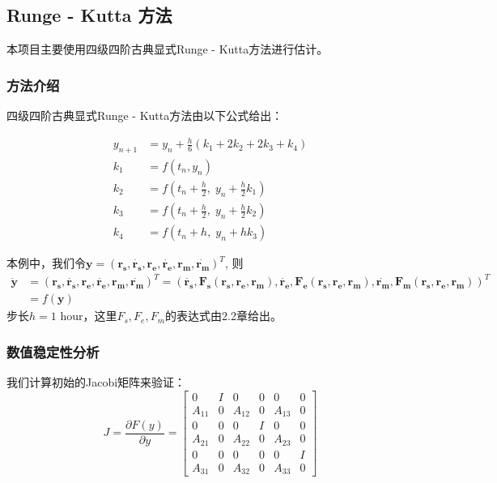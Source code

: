 \documentclass[hidelinks]{article}
\newcommand{\vt}[1]{\mathbf{#1}}
\begin{document}
\subsection{Runge - Kutta 方法}

本项目主要使用四级四阶古典显式Runge - Kutta方法进行估计。
\subsubsection{方法介绍}

四级四阶古典显式Runge - Kutta方法由以下公式给出：

\begin{align*}
y_{n+1} &= y_n + \frac{h}{6} \left(k_1 + 2k_2 + 2k_3 + k_4\right)\\
k_1 &= f(t_n, y_n) \\
k_2 &= f\left(t_n + \frac{h}{2},\; y_n + \frac{h}{2}k_1\right) \\
k_3 &= f\left(t_n + \frac{h}{2},\; y_n + \frac{h}{2}k_2\right) \\
k_4 &= f\left(t_n + h,\; y_n + h k_3\right)
\end{align*}

本例中，我们令$\vt{y} = (\vt{r_s}, \dot{\vt{r_s}}, \vt{r_e}, \dot{\vt{r_e}}, \vt{r_m}, \dot{\vt{r_m}})^T$, 则
\begin{align*}
\dot{\vt{y}} &= (\vt{r_s}, \dot{\vt{r_s}}, \vt{r_e}, \dot{\vt{r_e}}, \vt{r_m}, \dot{\vt{r_m}})^T = (\dot{\vt{r_s}}, \vt{F_s}(\vt{r_s}, \vt{r_e}, \vt{r_m}), \dot{\vt{r_e}}, \vt{F_e}(\vt{r_s}, \vt{r_e}, \vt{r_m}), \dot{\vt{r_m}}, \vt{F_m}(\vt{r_s}, \vt{r_e}, \vt{r_m}))^T\\
&= f(\vt{y})
\end{align*}
步长$h = 1 \mbox{ hour}$，这里$F_s, F_e, F_m$的表达式由2.2章给出。

\subsubsection{数值稳定性分析}

我们计算初始的Jacobi矩阵来验证：
\[
J = \frac{\partial F(y)}{\partial y} =
\begin{bmatrix}
0 & I & 0 & 0 & 0 & 0 \\
A_{11} & 0 & A_{12} & 0 & A_{13} & 0 \\
0 & 0 & 0 & I & 0 & 0 \\
A_{21} & 0 & A_{22} & 0 & A_{23} & 0 \\
0 & 0 & 0 & 0 & 0 & I \\
A_{31} & 0 & A_{32} & 0 & A_{33} & 0
\end{bmatrix}
\]
\end{document}
